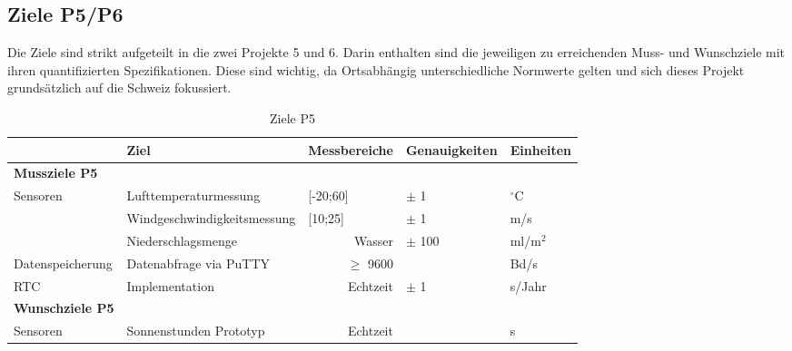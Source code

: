 \begin{landscape}
\subsection{Ziele P5/P6}
Die Ziele sind strikt aufgeteilt in die zwei Projekte 5 und 6. Darin enthalten sind die jeweiligen zu erreichenden Muss- und Wunschziele mit ihren quantifizierten Spezifikationen. Diese sind wichtig, da Ortsabhängig unterschiedliche Normwerte gelten und sich dieses Projekt grundsätzlich auf die Schweiz fokussiert.\\

\begin{table}[htbp]
  \centering
  \caption{Ziele P5}
    \begin{tabular}{r|l|r|l|l}
          & \textbf{Ziel} & \multicolumn{1}{l|}{\textbf{Messbereiche}} & \textbf{Genauigkeiten} & \textbf{Einheiten} \\
    \toprule
    \multicolumn{1}{l}{\textbf{Mussziele P5}} & \multicolumn{1}{r}{} & \multicolumn{1}{r}{} & \multicolumn{1}{r}{} &  \\
    \toprule
    \multicolumn{1}{l|}{Sensoren} & Lufttemperaturmessung & \multicolumn{1}{l|}{[-20;60]} & $\pm$ 1 & $^\circ$C \\
\cline{2-5}          & Windgeschwindigkeitsmessung & \multicolumn{1}{l|}{[10;25]} & $\pm$ 1   & m/s \\
\cline{2-5} & Niederschlagsmenge &   Wasser    & $\pm$ 100 & ml/m$^2$ \\
    \hline
    \multicolumn{1}{l|}{Datenspeicherung} & Datenabfrage via PuTTY &   $\geq$ 9600    &       &  Bd/s\\
    \hline
    \multicolumn{1}{l|}{RTC} & Implementation &   Echtzeit    & $\pm$ 1   & s/Jahr \\
\bottomrule
\multicolumn{1}{l}{\textbf{Wunschziele P5}} & \multicolumn{1}{l}{} & \multicolumn{1}{l}{} & \multicolumn{1}{l}{} &  \\
    \toprule
    \multicolumn{1}{l|}{Sensoren} & Sonnenstunden Prototyp &   Echtzeit    &       & s \\
    \bottomrule
    \end{tabular}%
  \label{tab:ZieleP5}%
\end{table}%



\end{landscape}
